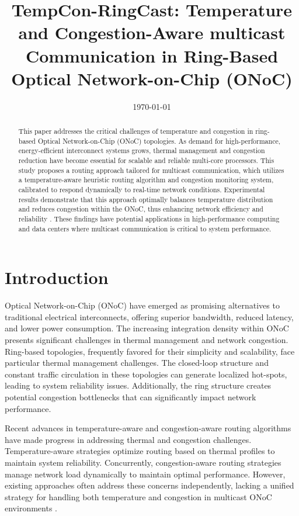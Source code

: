 \documentclass[conference]{IEEEtran}
\title{TempCon-RingCast: Temperature and Congestion-Aware multicast Communication in Ring-Based Optical Network-on-Chip (ONoC)}
\author{
    \IEEEauthorblockN{Abubeker Yasmin Mustefa\IEEEauthorrefmark{1}}
    \IEEEauthorblockA{\IEEEauthorrefmark{1}Department of Computer science, China Three Gorges University, Yichang , China\\
    Email: moli614360@gmail.com}
}
\date{\today}
\begin{document}
\maketitle

\begin{abstract}
This paper addresses the critical challenges of temperature and congestion in ring-based Optical Network-on-Chip (ONoC) topologies. As demand for high-performance, energy-efficient interconnect systems grows, thermal management and congestion reduction have become essential for scalable and reliable multi-core processors. This study proposes a routing approach tailored for multicast communication, which utilizes a temperature-aware heuristic routing algorithm and congestion monitoring system, calibrated to respond dynamically to real-time network conditions. Experimental results demonstrate that this approach optimally balances temperature distribution and reduces congestion within the ONoC, thus enhancing network efficiency and reliability \cite{yang2020survey}. These findings have potential applications in high-performance computing and data centers where multicast communication is critical to system performance.
\end{abstract}

\section{Introduction}
Optical Network-on-Chip (ONoC) have emerged as promising alternatives to traditional electrical interconnects, offering superior bandwidth, reduced latency, and lower power consumption. The increasing integration density within ONoC presents significant challenges in thermal management and network congestion. Ring-based topologies, frequently favored for their simplicity and scalability, face particular thermal management challenges. The closed-loop structure and constant traffic circulation in these topologies can generate localized hot-spots, leading to system reliability issues. Additionally, the ring structure creates potential congestion bottlenecks that can significantly impact network performance.

Recent advances in temperature-aware and congestion-aware routing algorithms have made progress in addressing thermal and congestion challenges. Temperature-aware strategies optimize routing based on thermal profiles to maintain system reliability. Concurrently, congestion-aware routing strategies manage network load dynamically to maintain optimal performance. However, existing approaches often address these concerns independently, lacking a unified strategy for handling both temperature and congestion in multicast ONoC environments \cite{9091547}.
\end{document}

